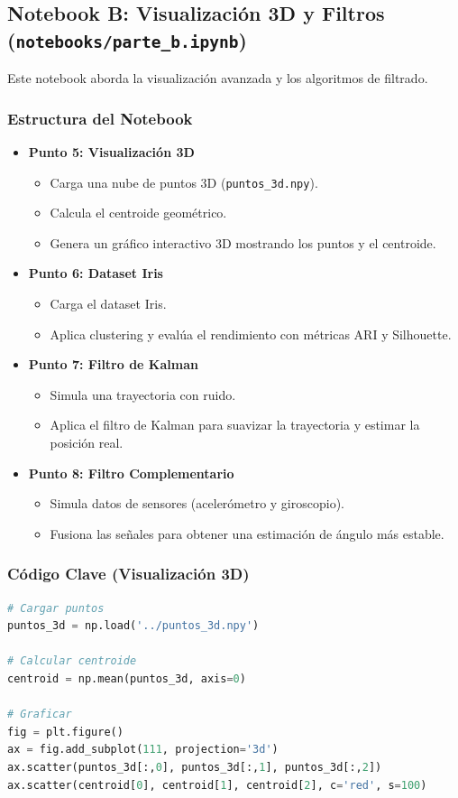 \documentclass[12pt, a4paper]{article}
\begin{document}
\subsection{Notebook B: Visualización 3D y Filtros (\texttt{notebooks/parte\_b.ipynb})}
Este notebook aborda la visualización avanzada y los algoritmos de filtrado.

\subsubsection{Estructura del Notebook}
\begin{itemize}
    \item \textbf{Punto 5: Visualización 3D}
    \begin{itemize}
        \item Carga una nube de puntos 3D (\texttt{puntos\_3d.npy}).
        \item Calcula el centroide geométrico.
        \item Genera un gráfico interactivo 3D mostrando los puntos y el centroide.
    \end{itemize}
    \item \textbf{Punto 6: Dataset Iris}
    \begin{itemize}
        \item Carga el dataset Iris.
        \item Aplica clustering y evalúa el rendimiento con métricas ARI y Silhouette.
    \end{itemize}
    \item \textbf{Punto 7: Filtro de Kalman}
    \begin{itemize}
        \item Simula una trayectoria con ruido.
        \item Aplica el filtro de Kalman para suavizar la trayectoria y estimar la posición real.
    \end{itemize}
    \item \textbf{Punto 8: Filtro Complementario}
    \begin{itemize}
        \item Simula datos de sensores (acelerómetro y giroscopio).
        \item Fusiona las señales para obtener una estimación de ángulo más estable.
    \end{itemize}
\end{itemize}

\subsubsection{Código Clave (Visualización 3D)}
\begin{lstlisting}[language=Python]
# Cargar puntos
puntos_3d = np.load('../puntos_3d.npy')

# Calcular centroide
centroid = np.mean(puntos_3d, axis=0)

# Graficar
fig = plt.figure()
ax = fig.add_subplot(111, projection='3d')
ax.scatter(puntos_3d[:,0], puntos_3d[:,1], puntos_3d[:,2])
ax.scatter(centroid[0], centroid[1], centroid[2], c='red', s=100)
\end{lstlisting}
\end{document}
